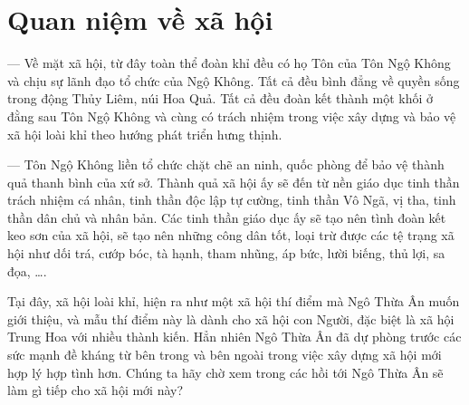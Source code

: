 
\section{Quan niệm về xã hội} %
\label{sec:2_quan_niem_ve_xa_hoi}

— Về mặt xã hội, từ đây toàn thể đoàn khỉ đều có họ Tôn của Tôn Ngộ Không và chịu sự lãnh đạo tổ chức của Ngộ Không. Tất cả đều bình đẳng về quyền sống trong động Thủy Liêm, núi Hoa Quả. Tất cả đều đoàn kết thành một khối ở đằng sau Tôn Ngộ Không và cùng có trách nhiệm trong việc xây dựng và bảo vệ xã hội loài khỉ theo hướng phát triển hưng thịnh.

— Tôn Ngộ Không liền tổ chức chặt chẽ an ninh, quốc phòng để bảo vệ thành quả thanh bình của xứ sở. Thành quả xã hội ấy sẽ đến từ nền giáo dục tinh thần trách nhiệm cá nhân, tinh thần độc lập tự cường, tinh thần Vô Ngã, vị tha, tinh thần dân chủ và nhân bản. Các tinh thần giáo dục ấy sẽ tạo nên tình đoàn kết keo sơn của xã hội, sẽ tạo nên những công dân tốt, loại trừ được các tệ trạng xã hội như dối trá, cướp bóc, tà hạnh, tham nhũng, áp bức, lười biếng, thủ lợi, sa đọa, \ldots.

Tại đây, xã hội loài khỉ, hiện ra như một xã hội thí điểm mà Ngô Thừa Ân muốn giới thiệu, và mẫu thí điểm này là dành cho xã hội con Người, đặc biệt là xã hội Trung Hoa với nhiều thành kiến. Hẳn nhiên Ngô Thừa Ân đã dự phòng trước các sức mạnh đề kháng từ bên trong và bên ngoài trong việc xây dựng xã hội mới hợp lý hợp tình hơn. Chúng ta hãy chờ xem trong các hồi tới Ngô Thừa Ân sẽ làm gì tiếp cho xã hội mới này?
